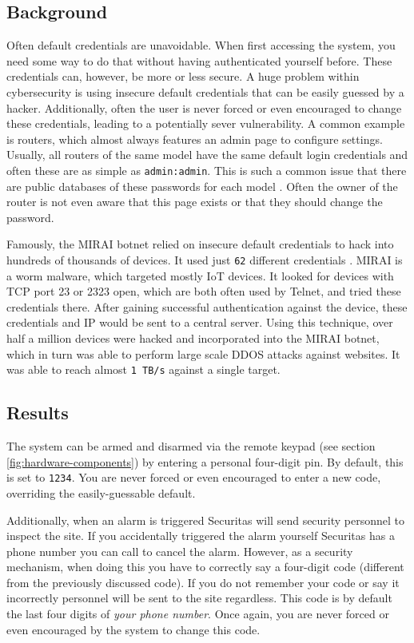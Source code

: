 \subsection{Background}
Often default credentials are unavoidable. When first accessing the system, you need some way to do that without having authenticated yourself before. These credentials can, however, be more or less secure. A huge problem within cybersecurity is using insecure default credentials that can be easily guessed by a hacker. Additionally, often the user is never forced or even encouraged to change these credentials, leading to a potentially sever vulnerability. A common example is routers, which almost always features an admin page to configure settings. Usually, all routers of the same model have the same default login credentials and often these are as simple as \texttt{admin:admin}. This is such a common issue that there are public databases of these passwords for each model . Often the owner of the router is not even aware that this page exists or that they should change the password.

Famously, the MIRAI botnet relied on insecure default credentials to hack into hundreds of thousands of devices. It used just \texttt{62} different credentials \cite{understanding-mirai}. MIRAI is a worm malware, which targeted mostly IoT devices. It looked for devices with TCP port 23 or 2323 open, which are both often used by Telnet, and tried these credentials there. After gaining successful authentication against the device, these credentials and IP would be sent to a central server. Using this technique, over half a million devices were hacked and incorporated into the MIRAI botnet, which in turn was able to perform large scale DDOS attacks against websites. It was able to reach almost \texttt{1 TB/s} against a single target.

\subsection{Results}
The system can be armed and disarmed via the remote keypad (see section \ref{fig:hardware-components}) by entering a personal four-digit pin. By default, this is set to \texttt{1234}. You are never forced or even encouraged to enter a new code, overriding the easily-guessable default.

Additionally, when an alarm is triggered Securitas will send security personnel to inspect the site. If you accidentally triggered the alarm yourself Securitas has a phone number you can call to cancel the alarm. However, as a security mechanism, when doing this you have to correctly say a four-digit code (different from the previously discussed code). If you do not remember your code or say it incorrectly personnel will be sent to the site regardless. This code is by default the last four digits of \textit{your phone number}. Once again, you are never forced or even encouraged by the system to change this code.

